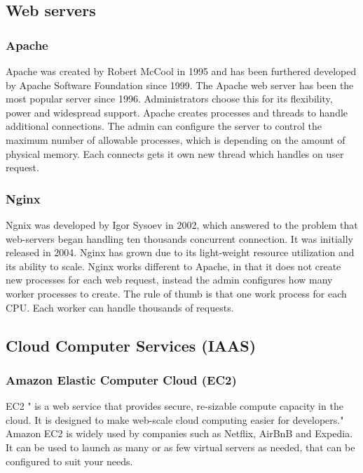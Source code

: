\subsection{Web servers}

\subsubsection{Apache}
Apache \cite{apache} was created by Robert McCool in 1995 and has been furthered developed by Apache Software Foundation since 1999. The Apache web server has been the most popular server since 1996. Administrators choose this for its flexibility, power and widespread support. Apache creates processes and threads to handle additional connections. The admin can configure the server to control the maximum number of allowable processes, which is depending on the amount of physical memory. Each connects gets it own new thread which handles on user request.

\subsubsection{Nginx}
Ngnix \cite{nginx} was developed by Igor Sysoev in 2002, which answered to the problem that web-servers began handling ten thousands concurrent connection. It was initially released in 2004. Nginx has grown due to its light-weight resource utilization and its ability to scale. Nginx works different to Apache, in that it does not create new processes for each web request, instead the admin configures how many worker processes to create. The rule of thumb is that one work process for each CPU. Each worker can handle thousands of requests.

\subsection{Cloud Computer Services (IAAS)}

\subsubsection{Amazon Elastic Computer Cloud (EC2)}
EC2 " is a web service that provides secure, re-sizable compute capacity in the cloud. It is designed to make web-scale cloud computing easier for developers." \cite{ec2} Amazon EC2 is widely used by companies such as Netflix, AirBnB and Expedia. It can be used to launch as many or as few virtual servers as needed, that can be configured to suit your needs.

